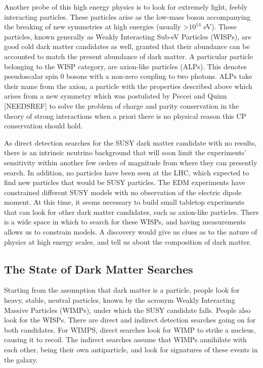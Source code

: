 \documentclass[11pt]{book}
\begin{document}
Another probe of this high energy physics is to look for extremely light, feebly interacting particles. These particles arise as the low-mass boson accompanying the breaking of new symmetries at high energies (usually >$10^{14}$ eV). These particles, known generally as Weakly Interacting Sub-eV Particles (WISPs), are good cold dark matter candidates as well, granted that their abundance can be accounted to match the present abundance of dark matter. A particular particle belonging to the WISP category, are axion-like particles (ALPs). This denotes pseudoscalar spin 0 bosons with a non-zero coupling to two photons. ALPs take their name from the axion, a particle with the properties described above which arises from a new symmetry which was postulated by Peccei and Quinn [NEEDSREF] to solve the problem of charge and parity conservation in the theory of strong interactions when a priori there is no physical reason this CP conservation should hold.

As direct detection searches for  the SUSY dark matter candidate with no results, there is an intrinsic neutrino background that will soon limit the experiments' sensitivity within another few orders of magnitude from where they can presently search. In addition, no particles have been seen at the LHC, which expected to find new particles that would be SUSY particles. The EDM experiments have constrained different SUSY models with no observation of the electric dipole moment. At this time, it seems necessary to build small tabletop experiments that can look for other dark matter candidates, such as axion-like particles. There is a wide space in which to search for these WISPs, and having measurements allows us to constrain models. A discovery would give us clues as to the nature of physics at high energy scales, and tell us about the composition of dark matter.

\subsection{The State of Dark Matter Searches}

Starting from the assumption that dark matter is a particle, people look for heavy, stable, neutral particles, known by the acronym Weakly Interacting Massive Particles (WIMPs), under which the SUSY candidate falls. People also look for the WISPs. There are direct and indirect detection searches going on for both candidates. For WIMPS, direct searches look for WIMP to strike a nucleus, causing it to recoil. The indirect searches assume that WIMPs annihilate with each other, being their own antiparticle, and look for signatures of these events in the galaxy.
\end{document}
